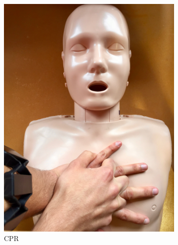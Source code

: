 \begin{figure}
 	\centering
 	\begin{subfigure}[b]{0.18\textwidth}
 		\includegraphics[width=\textwidth]{pictures/cpr}
 		\caption{CPR}
 		\label{fig:cpr}
 	\end{subfigure}
 	~ %
 	\begin{subfigure}[b]{0.18\textwidth}

\end{subfigure}
\end{figure}
